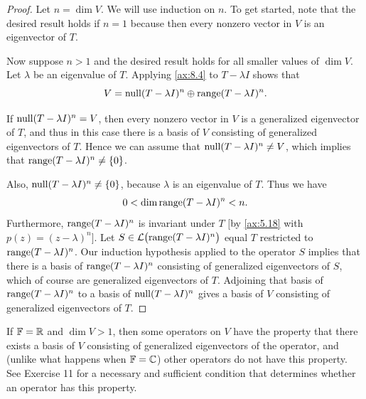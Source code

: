 \begin{proof}
Let $n=\dim V$. We will use induction on $n$. To get started, note that the
desired result holds if $n=1$ because then every nonzero vector in $V$ is an
eigenvector of $T$.

%
Now suppose $n>1$ and the desired result holds for all smaller values of
$\dim V$. Let $\lambda$ be an eigenvalue of $T$. Applying \ref{ax:8.4} to
$T-\lambda I$ shows that
\[ V = \operatorname{null}(T-\lambda I)^n\oplus\operatorname{range}(T-\lambda I)^n. \]

If $\operatorname{null}(T-\lambda I)^n=V$, then every nonzero vector in $V$ is a generalized
eigenvector of $T$, and thus in this case there is a basis of $V$ consisting
of generalized eigenvectors of $T$. Hence we can assume that
$\operatorname{null}(T-\lambda I)^n\ne V$, which implies that
$\operatorname{range}(T-\lambda I)^n\ne\{0\}$.

Also, $\operatorname{null}(T-\lambda I)^n\ne\{0\}$, because $\lambda$ is an eigenvalue of $T$.
Thus we have
\[ 0 < \operatorname{dim}\operatorname{range}(T-\lambda I)^n < n. \]
Furthermore, $\operatorname{range}(T-\lambda I)^n$ is invariant under $T$
$\bigl[$by \ref{ax:5.18} with $p(z)=(z-\lambda)^n\bigr]$. Let
$S\in\mathcal{L}\bigl(\operatorname{range}(T-\lambda I)^n\bigr)$ equal $T$ restricted to
$\operatorname{range}(T-\lambda I)^n$. Our induction hypothesis applied to the operator $S$
implies that there is a basis of $\operatorname{range}(T-\lambda I)^n$ consisting of
generalized eigenvectors of $S$, which of course are generalized eigenvectors
of $T$. Adjoining that basis of $\operatorname{range}(T-\lambda I)^n$ to a basis of
$\operatorname{null}(T-\lambda I)^n$ gives a basis of $V$ consisting of generalized
eigenvectors of $T$.
\end{proof}

If $\mathbb{F}=\mathbb{R}$ and $\dim V>1$, then some operators on $V$ have the property that
there exists a basis of $V$ consisting of generalized eigenvectors of the
operator, and (unlike what happens when $\mathbb{F}=\mathbb{C}$) other operators do not have
this property. See Exercise 11 for a necessary and sufficient condition that
determines whether an operator has this property.

